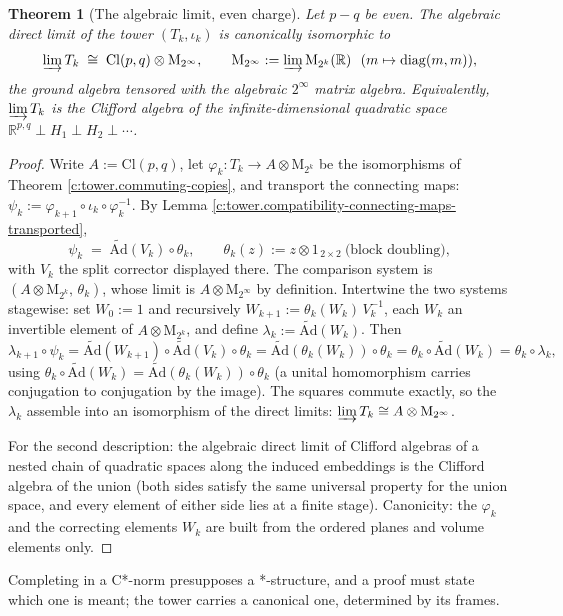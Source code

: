\documentclass[11pt]{article}
\newtheorem{theorem}{Theorem}[section]
\theoremstyle{definition}
\theoremstyle{plain}
\providecommand{\Ad}{}\renewcommand{\Ad}{\widetilde{\mathrm{Ad}}}
\providecommand{\Cl}{}\renewcommand{\Cl}{\mathrm{Cl}}
\providecommand{\Mat}{}\renewcommand{\Mat}{\mathrm{M}}
\providecommand{\R}{}\renewcommand{\R}{\mathbb{R}}
\begin{document}
\begin{theorem}[The algebraic limit, even charge]\label{c:tower.algebraic-limit-even-charge}
Let $p - q$ be even. The algebraic direct limit of the tower $(T_k, \iota_k)$ is canonically isomorphic to
\[
\varinjlim T_k \;\cong\; \Cl(p,q) \otimes \Mat_{2^\infty}, \qquad \Mat_{2^\infty} := \varinjlim \Mat_{2^k}(\R) \ \ (m \mapsto \operatorname{diag}(m,m)),
\]
the ground algebra tensored with the algebraic $2^\infty$ matrix algebra. Equivalently, $\varinjlim T_k$ is the Clifford algebra of the infinite-dimensional quadratic space $\R^{p,q} \perp H_1 \perp H_2 \perp \cdots$.
\end{theorem}
\begin{proof}
Write $A := \Cl(p,q)$, let $\varphi_k : T_k \to A \otimes \Mat_{2^k}$ be the isomorphisms of Theorem \ref{c:tower.commuting-copies}, and transport the connecting maps: $\psi_k := \varphi_{k+1} \circ \iota_k \circ \varphi_k^{-1}$. By Lemma \ref{c:tower.compatibility-connecting-maps-transported},
\[
\psi_k \;=\; \Ad(V_k) \circ \theta_k, \qquad \theta_k(z) := z \otimes 1_{\,2 \times 2}\ \text{(block doubling)},
\]
with $V_k$ the split corrector displayed there. The comparison system is $(A \otimes \Mat_{2^k},\, \theta_k)$, whose limit is $A \otimes \Mat_{2^\infty}$ by definition. Intertwine the two systems stagewise: set $W_0 := 1$ and recursively $W_{k+1} := \theta_k(W_k)\, V_k^{-1}$, each $W_k$ an invertible element of $A \otimes \Mat_{2^k}$, and define $\lambda_k := \Ad(W_k)$. Then
\[
\lambda_{k+1} \circ \psi_k = \Ad(W_{k+1}) \circ \Ad(V_k) \circ \theta_k = \Ad(\theta_k(W_k)) \circ \theta_k = \theta_k \circ \Ad(W_k) = \theta_k \circ \lambda_k ,
\]
using $\theta_k \circ \Ad(W_k) = \Ad(\theta_k(W_k)) \circ \theta_k$ (a unital homomorphism carries conjugation to conjugation by the image). The squares commute exactly, so the $\lambda_k$ assemble into an isomorphism of the direct limits: $\varinjlim T_k \cong A \otimes \Mat_{2^\infty}$.

For the second description: the algebraic direct limit of Clifford algebras of a nested chain of quadratic spaces along the induced embeddings is the Clifford algebra of the union (both sides satisfy the same universal property for the union space, and every element of either side lies at a finite stage). Canonicity: the $\varphi_k$ and the correcting elements $W_k$ are built from the ordered planes and volume elements only.

\end{proof}

\label{c:note.tower.setting-car-limit-2}
Completing in a C*-norm presupposes a *-structure, and a proof must state which one is meant; the tower carries a canonical one, determined by its frames.
\end{document}
